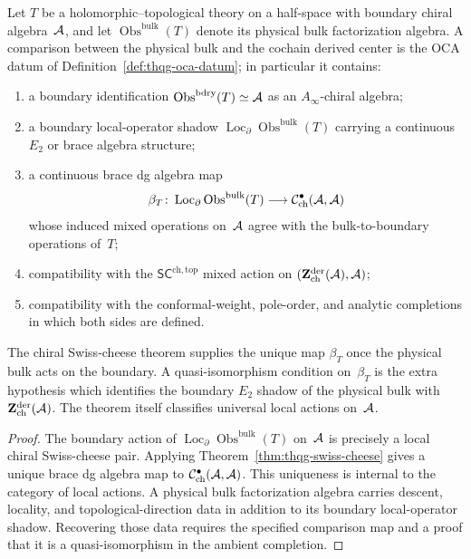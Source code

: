\begin{proposition}
\label{prop:thqg-universal-action-not-reconstruction}
Let $T$ be a holomorphic--topological theory on a half-space with
boundary chiral algebra~$\mathcal{A}$, and let
$\operatorname{Obs}^{\mathrm{bulk}}(T)$ denote its physical bulk
factorization algebra. A comparison between the physical bulk and
the cochain derived center is the OCA datum of
Definition~\ref{def:thqg-oca-datum}; in particular it contains:
\begin{enumerate}[label=\textup{(\roman*)}]
\item a boundary identification
 $\operatorname{Obs}^{\mathrm{bdry}}(T)\simeq \mathcal{A}$ as an
 $A_\infty$-chiral algebra;
\item a boundary local-operator shadow
 $\operatorname{Loc}_{\partial}
 \operatorname{Obs}^{\mathrm{bulk}}(T)$ carrying a continuous
 $E_2$ or brace algebra structure;
\item a continuous brace dg algebra map
 \[
 \beta_T\colon
 \operatorname{Loc}_{\partial}
 \operatorname{Obs}^{\mathrm{bulk}}(T)
 \longrightarrow
 \mathcal{C}^{\bullet}_{\mathrm{ch}}(\mathcal{A},\mathcal{A})
 \]
 whose induced mixed operations on~$\mathcal{A}$ agree with the
 bulk-to-boundary operations of~$T$;
\item compatibility with the
 $\mathsf{SC}^{\mathrm{ch,top}}$ mixed action on
 $(\mathbf{Z}^{\mathrm{der}}_{\mathrm{ch}}(\mathcal{A}),\mathcal{A})$;
\item compatibility with the conformal-weight, pole-order, and
 analytic completions in which both sides are defined.
\end{enumerate}
The chiral Swiss-cheese theorem supplies the unique map
$\beta_T$ once the physical bulk acts on the boundary. A
quasi-isomorphism condition on~$\beta_T$ is the extra hypothesis
which identifies the boundary $E_2$ shadow of the physical bulk with
$\mathbf{Z}^{\mathrm{der}}_{\mathrm{ch}}(\mathcal{A})$. The theorem itself
classifies universal local actions on~$\mathcal{A}$.
\end{proposition}

\begin{proof}
The boundary action of
$\operatorname{Loc}_{\partial}\operatorname{Obs}^{\mathrm{bulk}}(T)$
on~$\mathcal{A}$ is precisely a local chiral Swiss-cheese pair. Applying
Theorem~\ref{thm:thqg-swiss-cheese} gives a unique brace dg algebra
map to
$\mathcal{C}^{\bullet}_{\mathrm{ch}}(\mathcal{A},\mathcal{A})$. This uniqueness is
internal to the category of local actions. A physical bulk factorization
algebra carries descent, locality, and topological-direction data in
addition to its boundary local-operator shadow. Recovering those data
requires the specified comparison map and a proof that it is a
quasi-isomorphism in the ambient completion.
\end{proof}

